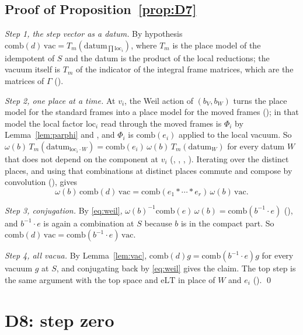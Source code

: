 \documentclass[11pt]{article}
\theoremstyle{definition}
\theoremstyle{remark}
\begin{document}
\subsection{Proof of Proposition~\ref{prop:D7}}
\emph{Step 1, the step vector as a datum.} By hypothesis $\mathrm{comb}(d)\,\mathrm{vac}=T_m(\mathrm{datum}_{\prod\mathrm{loc}_i})$, where $T_m$ is the place model of the idempotent of $S$ and the datum is the product of the local reductions; the vacuum itself is $T_m$ of the indicator of the integral frame matrices, which are the matrices of $\Gamma$ ().

\emph{Step 2, one place at a time.} At $v_i$, the Weil action of $(b_V,b_W)$ turns the place model for the standard frames into a place model for the moved frames (); in that model the local factor $\mathrm{loc}_i$ read through the moved frames is $\Phi_i$ by Lemma~\ref{lem:parphi} and , and $\Phi_i$ is $\mathrm{comb}(e_i)$ applied to the local vacuum. So $\omega(b)\,T_m(\mathrm{datum}_{\mathrm{loc}_i\cdot W})=\mathrm{comb}(e_i)\,\omega(b)\,T_m(\mathrm{datum}_W)$ for every datum $W$ that does not depend on the component at $v_i$ (, , , ). Iterating over the distinct places, and using that combinations at distinct places commute and compose by convolution (), gives
\[
\omega(b)\,\mathrm{comb}(d)\,\mathrm{vac}=\mathrm{comb}(e_1*\cdots*e_r)\,\omega(b)\,\mathrm{vac}.
\]

\emph{Step 3, conjugation.} By \eqref{eq:weil}, $\omega(b)^{-1}\mathrm{comb}(e)\,\omega(b)=\mathrm{comb}(b^{-1}\cdot e)$ (), and $b^{-1}\cdot e$ is again a combination at $S$ because $b$ is in the compact part. So $\mathrm{comb}(d)\,\mathrm{vac}=\mathrm{comb}(b^{-1}\cdot e)\,\mathrm{vac}$.

\emph{Step 4, all vacua.} By Lemma~\ref{lem:vac}, $\mathrm{comb}(d)g=\mathrm{comb}(b^{-1}\cdot e)g$ for every vacuum $g$ at $S$, and conjugating back by \eqref{eq:weil} gives the claim. The top step is the same argument with the top space and $\mathrm{eLT}$ in place of $W$ and $e_i$ (). \qed

\section{D8: step zero}\label{sec:D8}
\end{document}
